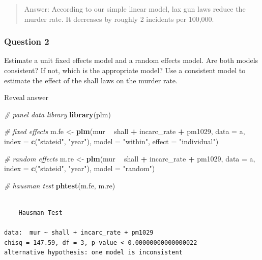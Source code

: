 \documentclass[]{article}
\newenvironment{Shaded}{\begin{snugshade}}{\end{snugshade}}
\newcommand{\KeywordTok}[1]{\textcolor[rgb]{0.13,0.29,0.53}{\textbf{#1}}}
\newcommand{\DataTypeTok}[1]{\textcolor[rgb]{0.13,0.29,0.53}{#1}}
\newcommand{\StringTok}[1]{\textcolor[rgb]{0.31,0.60,0.02}{#1}}
\newcommand{\CommentTok}[1]{\textcolor[rgb]{0.56,0.35,0.01}{\textit{#1}}}
\newcommand{\OperatorTok}[1]{\textcolor[rgb]{0.81,0.36,0.00}{\textbf{#1}}}
\newcommand{\NormalTok}[1]{#1}
\theoremstyle{definition}
\theoremstyle{definition}
\theoremstyle{definition}
\theoremstyle{remark}
\begin{document}
\begin{quote}
Answer: According to our simple linear model, lax gun laws reduce the
murder rate. It decreases by roughly 2 incidents per 100,000.
\end{quote}

\subsubsection{Question 2}\label{question-2-1}

Estimate a unit fixed effects model and a random effects model. Are both
models consistent? If not, which is the appropriate model? Use a
consistent model to estimate the effect of the shall laws on the murder
rate.

 Reveal answer

\begin{Shaded}
\begin{Highlighting}[]
\CommentTok{# panel data library}
\KeywordTok{library}\NormalTok{(plm)}

\CommentTok{# fixed effects}
\NormalTok{m.fe <-}\StringTok{ }\KeywordTok{plm}\NormalTok{(mur }\OperatorTok{~}\StringTok{ }\NormalTok{shall }\OperatorTok{+}\StringTok{ }\NormalTok{incarc_rate }\OperatorTok{+}\StringTok{ }\NormalTok{pm1029,}
\DataTypeTok{data =}\NormalTok{ a,}
\DataTypeTok{index =} \KeywordTok{c}\NormalTok{(}\StringTok{"stateid"}\NormalTok{, }\StringTok{"year"}\NormalTok{),}
\DataTypeTok{model =} \StringTok{"within"}\NormalTok{,}
\DataTypeTok{effect =} \StringTok{"individual"}\NormalTok{)}

\CommentTok{# random effects}
\NormalTok{m.re <-}\StringTok{ }\KeywordTok{plm}\NormalTok{(mur }\OperatorTok{~}\StringTok{ }\NormalTok{shall }\OperatorTok{+}\StringTok{ }\NormalTok{incarc_rate }\OperatorTok{+}\StringTok{ }\NormalTok{pm1029,}
\DataTypeTok{data =}\NormalTok{ a,}
\DataTypeTok{index =} \KeywordTok{c}\NormalTok{(}\StringTok{"stateid"}\NormalTok{, }\StringTok{"year"}\NormalTok{),}
\DataTypeTok{model =} \StringTok{"random"}\NormalTok{)}

\CommentTok{# hausman test}
\KeywordTok{phtest}\NormalTok{(m.fe, m.re)}
\end{Highlighting}
\end{Shaded}

\begin{verbatim}

    Hausman Test

data:  mur ~ shall + incarc_rate + pm1029
chisq = 147.59, df = 3, p-value < 0.00000000000000022
alternative hypothesis: one model is inconsistent
\end{verbatim}
\end{document}
